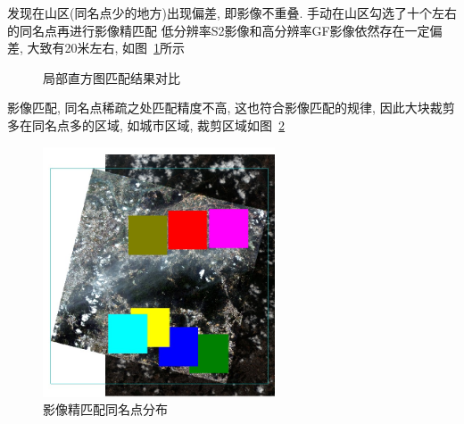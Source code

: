 发现在山区(同名点少的地方)出现偏差, 即影像不重叠. 手动在山区勾选了十个左右的同名点再进行影像精匹配 低分辨率S2影像和高分辨率GF影像依然存在一定偏差, 大致有20米左右, 如图~\ref{fig:0211}所示

\begin{figure}[!htbp]
    \centering
    \qquad
    \caption{局部直方图匹配结果对比}
    \label{fig:0211}
\end{figure}

影像匹配, 同名点稀疏之处匹配精度不高, 这也符合影像匹配的规律, 因此大块裁剪多在同名点多的区域, 如城市区域, 裁剪区域如图~\ref{fig:0200}

\begin{figure}[!htbp]
    \centering
    \includegraphics[height=20em]{pic/q0200.jpg}
    \caption{影像精匹配同名点分布}
    \label{fig:0200}
\end{figure}

